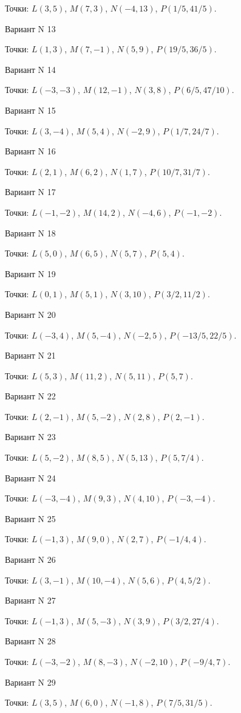 \documentclass[11pt]{report}
\begin{document}
Точки: $L(3, 5)$, $M(7, 3)$, $N(-4, 13)$, $P(1/5, 41/5)$.

Вариант N 13

Точки: $L(1, 3)$, $M(7, -1)$, $N(5, 9)$, $P(19/5, 36/5)$.

Вариант N 14

Точки: $L(-3, -3)$, $M(12, -1)$, $N(3, 8)$, $P(6/5, 47/10)$.

Вариант N 15

Точки: $L(3, -4)$, $M(5, 4)$, $N(-2, 9)$, $P(1/7, 24/7)$.

Вариант N 16

Точки: $L(2, 1)$, $M(6, 2)$, $N(1, 7)$, $P(10/7, 31/7)$.

Вариант N 17

Точки: $L(-1, -2)$, $M(14, 2)$, $N(-4, 6)$, $P(-1, -2)$.

Вариант N 18

Точки: $L(5, 0)$, $M(6, 5)$, $N(5, 7)$, $P(5, 4)$.

Вариант N 19

Точки: $L(0, 1)$, $M(5, 1)$, $N(3, 10)$, $P(3/2, 11/2)$.

Вариант N 20

Точки: $L(-3, 4)$, $M(5, -4)$, $N(-2, 5)$, $P(-13/5, 22/5)$.

Вариант N 21

Точки: $L(5, 3)$, $M(11, 2)$, $N(5, 11)$, $P(5, 7)$.

Вариант N 22

Точки: $L(2, -1)$, $M(5, -2)$, $N(2, 8)$, $P(2, -1)$.

Вариант N 23

Точки: $L(5, -2)$, $M(8, 5)$, $N(5, 13)$, $P(5, 7/4)$.

Вариант N 24

Точки: $L(-3, -4)$, $M(9, 3)$, $N(4, 10)$, $P(-3, -4)$.

Вариант N 25

Точки: $L(-1, 3)$, $M(9, 0)$, $N(2, 7)$, $P(-1/4, 4)$.

Вариант N 26

Точки: $L(3, -1)$, $M(10, -4)$, $N(5, 6)$, $P(4, 5/2)$.

Вариант N 27

Точки: $L(-1, 3)$, $M(5, -3)$, $N(3, 9)$, $P(3/2, 27/4)$.

Вариант N 28

Точки: $L(-3, -2)$, $M(8, -3)$, $N(-2, 10)$, $P(-9/4, 7)$.

Вариант N 29

Точки: $L(3, 5)$, $M(6, 0)$, $N(-1, 8)$, $P(7/5, 31/5)$.
\end{document}
